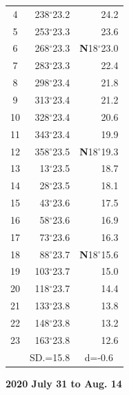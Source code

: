 \documentclass[10pt, a4paper]{report}
\begin{document}
\begin{scriptsize}
\begin{tabular*}{0.2\textwidth}[t]{@{\extracolsep{\fill}}|c|rr|}
4 & 238$^\circ$23.2 & 24.2\\
5 & 253$^\circ$23.3 & 23.6\\[2Pt]
6 & 268$^\circ$23.3 & \textbf{N}18$^\circ$23.0\\
7 & 283$^\circ$23.3 & 22.4\\
8 & 298$^\circ$23.4 & 21.8\\
9 & 313$^\circ$23.4 & \raisebox{0.24ex}{\boldmath$\cdot$~\boldmath$\cdot$~~}21.2\\
10 & 328$^\circ$23.4 & 20.6\\
11 & 343$^\circ$23.4 & 19.9\\[2Pt]
12 & 358$^\circ$23.5 & \textbf{N}18$^\circ$19.3\\
13 & 13$^\circ$23.5 & 18.7\\
14 & 28$^\circ$23.5 & 18.1\\
15 & 43$^\circ$23.6 & \raisebox{0.24ex}{\boldmath$\cdot$~\boldmath$\cdot$~~}17.5\\
16 & 58$^\circ$23.6 & 16.9\\
17 & 73$^\circ$23.6 & 16.3\\[2Pt]
18 & 88$^\circ$23.7 & \textbf{N}18$^\circ$15.6\\
19 & 103$^\circ$23.7 & 15.0\\
20 & 118$^\circ$23.7 & 14.4\\
21 & 133$^\circ$23.8 & \raisebox{0.24ex}{\boldmath$\cdot$~\boldmath$\cdot$~~}13.8\\
22 & 148$^\circ$23.8 & 13.2\\
23 & 163$^\circ$23.8 & 12.6\\
\hline
\rule{0pt}{2.4ex} & \multicolumn{1}{c}{SD.=15.8} & \multicolumn{1}{c|}{d=-0.6}\\
\hline
\end{tabular*}

\end{scriptsize}
\newpage
\sffamily
\noindent
\begin{flushright}
\textbf{2020 July 31 to Aug. 14}\par
\end{flushright}
\end{document}
